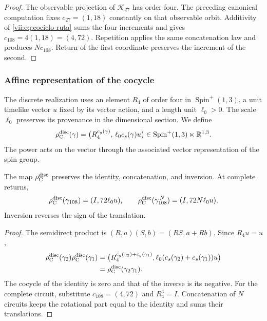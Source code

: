 \begin{proof}
The observable projection of \(\mathcal K_{27}\) has order four.
The preceding canonical computation fixes \(c_{27}=(1,18)\) constantly
on that observable orbit. Additivity of
\eqref{vii:eq:cociclo-ruta} sums the four increments and gives
\(c_{108}=4(1,18)=(4,72)\).
Repetition applies the same concatenation law and produces
\(Nc_{108}\). Return of the first coordinate preserves the
increment of the second.
\end{proof}

\subsubsection{Affine representation of the cocycle}
\label{vii:subsec:representacion-afin-cociclo}

The discrete realization uses an element \(R_4\) of order four in
\(\operatorname{Spin}^+(1,3)\), a unit timelike vector \(u\)
fixed by its vector action, and a length unit \(\ell_0>0\).
The scale \(\ell_0\) preserves its provenance in the dimensional section.
We define
\begin{equation}
 \rho_{\rm C}^{\rm disc}(\gamma)=
 \bigl(R_4^{c_g(\gamma)},\,\ell_0c_s(\gamma)u\bigr)
 \in\operatorname{Spin}^+(1,3)\ltimes\mathbb R^{1,3}.
 \label{vii:eq:representacion-discreta-memoria}
\end{equation}
The power acts on the vector through the associated vector
representation of the spin group.

\begin{theorem}
\label{vii:thm:traslacion-memoria}
The map \(\rho_{\rm C}^{\rm disc}\) preserves the identity,
concatenation, and inversion. At complete returns,
\begin{equation}
 \rho_{\rm C}^{\rm disc}(\gamma_{108})=(I,72\ell_0u),\qquad
 \rho_{\rm C}^{\rm disc}(\gamma_{108}^{\,N})=(I,72N\ell_0u).
 \label{vii:eq:traslacion-retorno-108}
\end{equation}
Inversion reverses the sign of the translation.
\end{theorem}

\begin{proof}
The semidirect product is
\((R,a)(S,b)=(RS,a+Rb)\). Since \(R_4u=u\),
\[
\begin{split}
 \rho_{\rm C}^{\rm disc}(\gamma_2)
 \rho_{\rm C}^{\rm disc}(\gamma_1)
 &=
 \bigl(R_4^{c_g(\gamma_2)+c_g(\gamma_1)},
 \ell_0(c_s(\gamma_2)+c_s(\gamma_1))u\bigr)\\
 &=\rho_{\rm C}^{\rm disc}(\gamma_2\gamma_1).
\end{split}
\]
The cocycle of the identity is zero and that of the inverse is its negative.
For the complete circuit, substitute \(c_{108}=(4,72)\) and
\(R_4^4=I\). Concatenation of \(N\) circuits keeps the rotational
part equal to the identity and sums their translations.
\end{proof}

